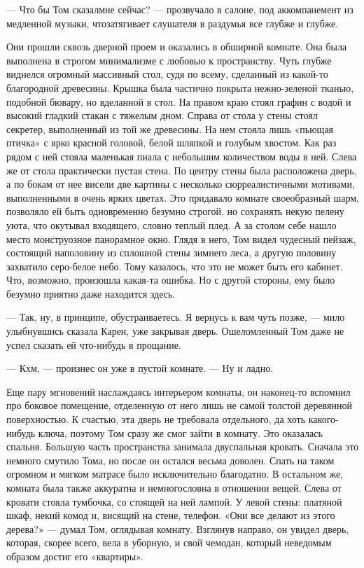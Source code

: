 — Что бы Том сказалмне сейчас? — прозвучало в салоне, под аккомпанемент из медленной музыки, чтозатягивает слушателя в раздумья все глубже и глубже.

Они прошли сквозь дверной проем и оказались в обширной комнате. Она была выполнена в строгом минимализме с любовью к пространству. Чуть глубже виднелся огромный массивный стол, судя по всему, сделанный из какой-то благородной древесины. Крышка была частично покрыта нежно-зеленой тканью, подобной бювару, но вделанной в стол. На правом краю стоял графин с водой и высокий гладкий стакан с тяжелым дном. Справа от стола у стены стоял секретер, выполненный из той же древесины. На нем стояла лишь «пьющая птичка» с ярко красной головой, белой шляпкой и голубым хвостом. Как раз рядом с ней стояла маленькая пиала с небольшим количеством воды в ней. Слева же от стола практически пустая стена. По центру стены была расположена дверь, а по бокам от нее висели две картины с несколько сюрреалистичными мотивами, выполненными в очень ярких цветах. Это придавало комнате своеобразный шарм, позволяло ей быть одновременно безумно строгой, но сохранять некую пелену уюта, что окутывал входящего, словно теплый плед. А за столом себе нашло место монструозное панорамное окно. Глядя в него, Том видел чудесный пейзаж, состоящий наполовину из сплошной стены зимнего леса, а другую половину захватило серо-белое небо. Тому казалось, что это не может быть его кабинет. Что, возможно, произошла какая-та ошибка. Но с другой стороны, ему было безумно приятно даже находится здесь.

— Так, ну, в принципе, обустраиваетесь. Я вернусь к вам чуть позже, — мило улыбнувшись сказала Карен, уже закрывая дверь. Ошеломленный Том даже не успел сказать ей что-нибудь в прощание.

— Кхм, — произнес он уже в пустой комнате. — Ну и ладно.

Еще пару мгновений наслаждаясь интерьером комнаты, он наконец-то вспомнил про боковое помещение, отделенную от него лишь не самой толстой деревянной поверхностью. К счастью, эта дверь не требовала отдельного, да хоть какого-нибудь ключа, поэтому Том сразу же смог зайти в комнату. Это оказалась спальня. Большую часть пространства занимала двуспальная кровать. Сначала это немного смутило Тома, но после он остался весьма доволен. Спать на таком огромном и мягком матрасе было исключительно благодатно. В остальном же, комната была также аккуратна и немногословна в отношении вещей. Слева от кровати стояла тумбочка, со стоящей на ней лампой. У левой стены: платяной шкаф, некий комод и, висящий на стене, телефон. «Они все делают из этого дерева?» — думал Том, оглядывая комнату. Взглянув направо, он увидел дверь, которая, скорее всего, вела в уборную, и свой чемодан, который неведомым образом достиг его «квартиры».

